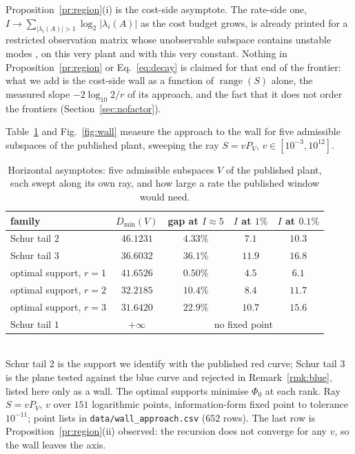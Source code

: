 \begin{remark}
\label{rmk:dual}
Proposition~\ref{pr:region}(i) is the cost-side asymptote. The rate-side one,
$I\to\sum_{|\lambda_i(A)|>1}\log_2|\lambda_i(A)|$ as the cost budget grows, is
already printed for a restricted observation matrix whose unobservable subspace
contains unstable modes \cite[Sec.~IV-A, Fig.~3]{sabag2021reducing}, on this very
plant and with this very constant. Nothing in Proposition~\ref{pr:region} or
Eq.~\eqref{eq:decay} is claimed for that end of the frontier: what we add is the
cost-side wall as a function of $\operatorname{range}(S)$ alone, the measured
slope $-2\log_{10}2/r$ of its approach, and the fact that it does not order the
frontiers (Section~\ref{sec:nofactor}).
\end{remark}

Table~\ref{tab:wall} and Fig.~\ref{fig:wall} measure the approach to the wall for
five admissible subspaces of the published plant, sweeping the ray
$S=vP_V$, $v\in[10^{-3},10^{12}]$.

\begin{table}[h]
 \centering\caption{Horizontal asymptotes: five admissible subspaces $V$ of
 the published plant, each swept along its own ray, and how large a rate the
 published window would need.}
 \label{tab:wall}
 \begin{tabularx}{\columnwidth}{Xcccc}
 \hline
 family & $D_{\min}(V)$ & gap at $I\approx5$ &
 $I$ at $1\%$ & $I$ at $0.1\%$ \\
 \hline
 Schur tail $2$ & $46.1231$ & $4.33\%$ & $7.1$ & $10.3$ \\
 Schur tail $3$ & $36.6032$ & $36.1\%$ & $11.9$ & $16.8$ \\
 optimal support, $r=1$ & $41.6526$ & $0.50\%$ & $4.5$ & $6.1$ \\
 optimal support, $r=2$ & $32.2185$ & $10.4\%$ & $8.4$ & $11.7$ \\
 optimal support, $r=3$ & $31.6420$ & $22.9\%$ & $10.7$ & $15.6$ \\
 Schur tail $1$ & $+\infty$ & \multicolumn{3}{c}{no fixed point} \\
 \hline
 \end{tabularx}
 \\[1pt]{\scriptsize Schur tail $2$ is the support we identify with the
 published red curve; Schur tail $3$ is the plane tested against the blue curve
 and rejected in Remark~\ref{rmk:blue}, listed here only as a wall. The optimal
 supports minimise $\Phi_0$ at each rank. Ray $S=vP_V$, $v$ over $151$
 logarithmic points,
 information-form fixed point to tolerance $10^{-11}$; point lists in
 \texttt{data/wall\_approach.csv} ($652$ rows). The last row is
 Proposition~\ref{pr:region}(ii) observed: the recursion does not converge for
 any $v$, so the wall leaves the axis.}
\end{table}

